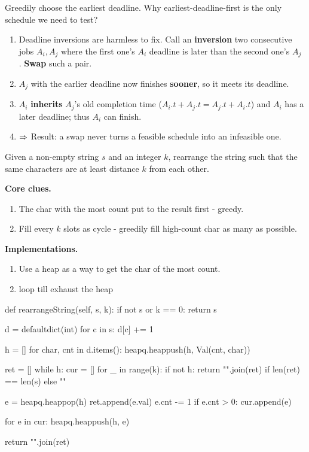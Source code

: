 Greedily choose the earliest deadline. Why earliest-deadline-first is the only schedule we need to test? 
\begin{enumerate}
\item Deadline inversions are harmless to fix. Call an \textbf{inversion} two consecutive jobs $A_i, A_j$ where the first one’s $A_i$ deadline is later than the second one’s $A_j$ . \textbf{Swap} such a pair.
\item $A_j$ with the earlier deadline now finishes \textbf{sooner}, so it meets its deadline. 
\item $A_i$ \textbf{inherits} $A_j$'s old completion time ($A_i.t + A_j.t = A_j.t + A_i.t$) and $A_i$ has a later deadline; thus $A_i$ can finish. 
\item $\Rightarrow$ Result: a swap never turns a feasible schedule into an infeasible one.
\end{enumerate}


 Given a non-empty string $s$ and an integer $k$, rearrange the string such that the same characters are at least distance
$k$ from each other.

\textbf{Core clues.} 
\begin{enumerate}
\item The char with the most count put to the result first - greedy.
\item Fill every $k$ slots as cycle - greedily fill high-count char as many as possible.
\end{enumerate}

\textbf{Implementations.}
\begin{enumerate}
\item Use a heap as a way to get the char of the most count. 
\item {} loop till exhaust the heap
\end{enumerate}

\begin{python}
def rearrangeString(self, s, k):
  if not s or k == 0: return s

  d = defaultdict(int)
  for c in s:
    d[c] += 1

  h = []
  for char, cnt in d.items():
    heapq.heappush(h, Val(cnt, char))

  ret = []
  while h:
    cur = []
    for _ in range(k):
      if not h: 
        return "".join(ret) if len(ret) == len(s) else ""

      e = heapq.heappop(h)
      ret.append(e.val)
      e.cnt -= 1
      if e.cnt > 0:
        cur.append(e)

    for e in cur:
      heapq.heappush(h, e)

  return "".join(ret)

\end{python}
